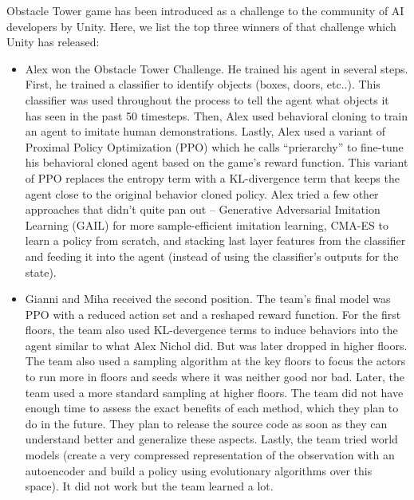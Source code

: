 \documentclass[conference]{IEEEtran}
\begin{document}
Obstacle Tower game has been introduced as a challenge to the community of AI developers by Unity. Here, we list the top three winners of that challenge which Unity has released:
\begin{itemize}
\item Alex won the Obstacle Tower Challenge. He trained his agent in several steps. First, he trained a classifier to identify objects (boxes, doors, etc..). This classifier was used throughout the process to tell the agent what objects it has seen in the past 50 timesteps. Then, Alex used behavioral cloning to train an agent to imitate human demonstrations. Lastly, Alex used a variant of Proximal Policy Optimization (PPO) which he calls “prierarchy” to fine-tune his behavioral cloned agent based on the game’s reward function. This variant of PPO replaces the entropy term with a KL-divergence term that keeps the agent close to the original behavior cloned policy. Alex tried a few other approaches that didn’t quite pan out – Generative Adversarial Imitation Learning (GAIL) for more sample-efficient imitation learning, CMA-ES to learn a policy from scratch, and stacking last layer features from the classifier and feeding it into the agent (instead of using the classifier’s outputs for the state).
\item Gianni and Miha received the second position. The team’s final model was PPO with a reduced action set and a reshaped reward function. For the first floors, the team also used KL-devergence terms to induce behaviors into the agent similar to what Alex Nichol did. But was later dropped in higher floors. The team also used a sampling algorithm at the key floors to focus the actors to run more in floors and seeds where it was neither good nor bad. Later, the team used a more standard sampling at higher floors. The team did not have enough time to assess the exact benefits of each method, which they plan to do in the future. They plan to release the source code as soon as they can understand better and generalize these aspects. Lastly, the team tried world models (create a very compressed representation of the observation with an autoencoder and build a policy using evolutionary algorithms over this space). It did not work but the team learned a lot.

\end{itemize}
\end{document}
